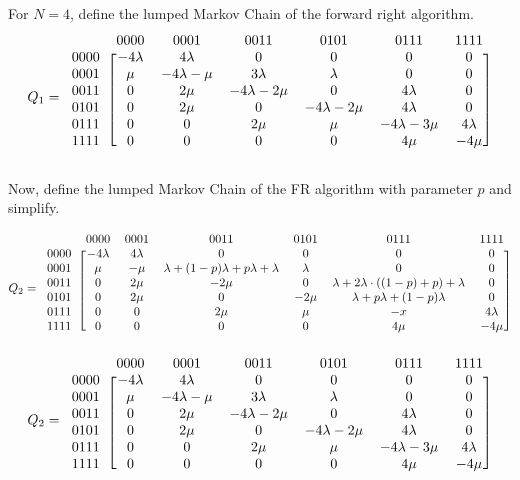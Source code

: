 \documentclass[10pt,a4paper]{article}
\begin{document}
For $N=4$, define the lumped Markov Chain of the forward right algorithm.
\[ Q_1 =
  \begin{blockarray}{ccccccc}
    & 0000 & 0001 & 0011 & 0101 & 0111 & 1111 \\
    \begin{block}{c[cccccc]}
    0000 & -4\lambda & 4\lambda & 0 & 0 & 0 & 0 \\
    0001 & \mu & -4\lambda-\mu & 3\lambda & \lambda & 0 & 0 \\
    0011 & 0 & 2\mu & -4\lambda-2\mu & 0 & 4\lambda & 0 \\
    0101 & 0 & 2\mu & 0 & -4\lambda-2\mu & 4\lambda & 0  \\
    0111 & 0 & 0 & 2\mu & \mu & -4\lambda-3\mu & 4\lambda \\
    1111 & 0 & 0 & 0 & 0 & 4\mu & -4\mu \\
    \end{block}
  \end{blockarray}
\]

Now, define the lumped Markov Chain of the FR algorithm with parameter $p$ and simplify.

\[ Q_2 =
  \begin{blockarray}{ccccccc}
    & 0000 & 0001 & 0011 & 0101 & 0111 & 1111 \\
    \begin{block}{c[cccccc]}
    0000 & -4 \lambda & 4\lambda & 0 & 0 & 0 & 0 \\
    0001 & \mu & -\mu & \lambda + (1-p)\lambda+p\lambda+\lambda & \lambda & 0 & 0 \\
    0011 & 0 & 2\mu & -2\mu & 0 & \lambda+2\lambda \cdot ((1-p)+p)+\lambda & 0 \\
    0101 & 0 & 2\mu & 0 & -2\mu & \lambda+p\lambda+(1-p)\lambda & 0  \\
    0111 & 0 & 0 & 2\mu & \mu & -x & 4\lambda \\
    1111 & 0 & 0 & 0 & 0 & 4\mu & -4\mu \\
    \end{block}
  \end{blockarray}
\]
\[ Q_2 =
  \begin{blockarray}{ccccccc}
    & 0000 & 0001 & 0011 & 0101 & 0111 & 1111 \\
    \begin{block}{c[cccccc]}
    0000 & -4\lambda & 4\lambda & 0 & 0 & 0 & 0 \\
    0001 & \mu & -4\lambda-\mu & 3\lambda & \lambda & 0 & 0 \\
    0011 & 0 & 2\mu & -4\lambda-2\mu & 0 & 4\lambda & 0 \\
    0101 & 0 & 2\mu & 0 & -4\lambda-2\mu & 4\lambda & 0  \\
    0111 & 0 & 0 & 2\mu & \mu & -4\lambda-3\mu & 4\lambda \\
    1111 & 0 & 0 & 0 & 0 & 4\mu & -4\mu \\
    \end{block}
  \end{blockarray}
\]
\end{document}
